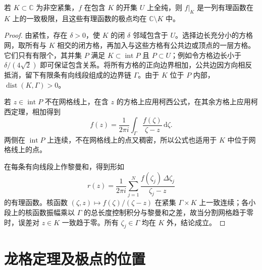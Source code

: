 \begin{lemma}[以外部点为极点的有理逼近]
\label{lem:ca-rational-cauchy}
若 $K\subset\mathbb C$ 为非空紧集，$f$ 在包含 $K$ 的开集 $U$ 上全纯，则 $f|_K$ 是一列有理函数在 $K$ 上的一致极限，且这些有理函数的极点均在 $\mathbb C\setminus K$ 中。
\end{lemma}
\begin{proof}
由紧性，存在 $\delta>0$，使 $K$ 的闭 $\delta$ 邻域包含于 $U$。选择边长充分小的方格网，取所有与 $K$ 相交的闭方格，再加入与这些方格有公共边或顶点的一层方格。它们只有有限个，其并集 $P$ 满足 $K\subset\operatorname{int}P$ 且 $P\subset U$；例如令方格边长小于 $\delta/(4\sqrt2)$ 即可保证包含关系。将所有方格的正向边界相加，公共边因方向相反抵消，留下有限条有向线段组成的边界链 $\Gamma$。由于 $K$ 位于 $P$ 内部，$\operatorname{dist}(K,\Gamma)>0$。

若 $z\in\operatorname{int}P$ 不在网格线上，在含 $z$ 的方格上应用柯西公式，在其余方格上应用柯西定理，相加得到
\[
 f(z)=\frac1{2\pi i}\int_\Gamma\frac{f(\zeta)}{\zeta-z}\,\mathrm d\zeta.
\]
两侧在 $\operatorname{int}P$ 上连续，不在网格线上的点又稠密，所以公式也适用于 $K$ 中位于网格线上的点。

在每条有向线段上作黎曼和，得到形如
\[
 r(z)=\frac1{2\pi i}\sum_{j=1}^N
       \frac{f(\zeta_j)\,\Delta\zeta_j}{\zeta_j-z}
\]
的有理函数。核函数 $(\zeta,z)\mapsto f(\zeta)/(\zeta-z)$ 在紧集 $\Gamma\times K$ 上一致连续；各小段上的核函数振幅乘以 $\Gamma$ 的总长度控制积分与黎曼和之差，故当分割网格趋于零时，误差对 $z\in K$ 一致趋于零。所有 $\zeta_j\in\Gamma$ 均在 $K$ 外，结论成立。
\end{proof}

\section{龙格定理及极点的位置}

